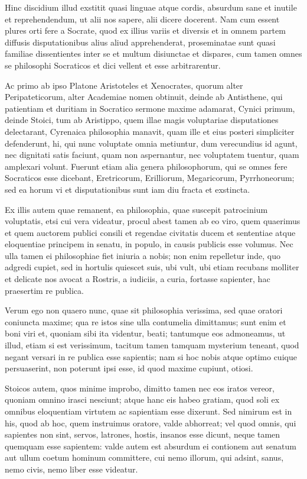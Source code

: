  Hinc discidium illud exstitit quasi linguae atque cordis, absurdum sane et inutile et reprehendendum, ut alii nos sapere, alii dicere docerent. Nam cum essent plures orti fere a Socrate, quod ex illius variis et diversis et in omnem partem diffusis disputationibus alius aliud apprehenderat, proseminatae sunt quasi familiae dissentientes inter se et multum disiunctae et dispares, cum tamen omnes se philosophi Socraticos et dici vellent et esse arbitrarentur.

 Ac primo ab ipso Platone Aristoteles et Xenocrates, quorum alter Peripateticorum, alter Academiae nomen obtinuit, deinde ab Antisthene, qui patientiam et duritiam in Socratico sermone maxime adamarat, Cynici primum, deinde Stoici, tum ab Aristippo, quem illae magis voluptariae disputationes delectarant, Cyrenaica philosophia manavit, quam ille et eius posteri simpliciter defenderunt, hi, qui nunc voluptate omnia metiuntur, dum verecundius id agunt, nec dignitati satis faciunt, quam non aspernantur, nec voluptatem tuentur, quam amplexari volunt. Fuerunt etiam alia genera philosophorum, qui se omnes fere Socraticos esse dicebant, Eretricorum, Erilliorum, Megaricorum, Pyrrhoneorum; sed ea horum vi et disputationibus sunt iam diu fracta et exstincta.

 Ex illis autem quae remanent, ea philosophia, quae suscepit patrocinium voluptatis, etsi cui vera videatur, procul abest tamen ab eo viro, quem quaerimus et quem auctorem publici consili et regendae civitatis ducem et sententiae atque eloquentiae principem in senatu, in populo, in causis publicis esse volumus. Nec ulla tamen ei philosophiae fiet iniuria a nobis; non enim repelletur inde, quo adgredi cupiet, sed in hortulis quiescet suis, ubi vult, ubi etiam recubans molliter et delicate nos avocat a Rostris, a iudiciis, a curia, fortasse sapienter, hac praesertim re publica.

 Verum ego non quaero nunc, quae sit philosophia verissima, sed quae oratori coniuncta maxime; qua re istos sine ulla contumelia dimittamus; sunt enim et boni viri et, quoniam sibi ita videntur, beati; tantumque eos admoneamus, ut illud, etiam si est verissimum, tacitum tamen tamquam mysterium teneant, quod negant versari in re publica esse sapientis; nam si hoc nobis atque optimo cuique persuaserint, non poterunt ipsi esse, id quod maxime cupiunt, otiosi.

 Stoicos autem, quos minime improbo, dimitto tamen nec eos iratos vereor, quoniam omnino irasci nesciunt; atque hanc eis habeo gratiam, quod soli ex omnibus eloquentiam virtutem ac sapientiam esse dixerunt. Sed nimirum est in his, quod ab hoc, quem instruimus oratore, valde abhorreat; vel quod omnis, qui sapientes non sint, servos, latrones, hostis, insanos esse dicunt, neque tamen quemquam esse sapientem: valde autem est absurdum ei contionem aut senatum aut ullum coetum hominum committere, cui nemo illorum, qui adsint, sanus, nemo civis, nemo liber esse videatur.

